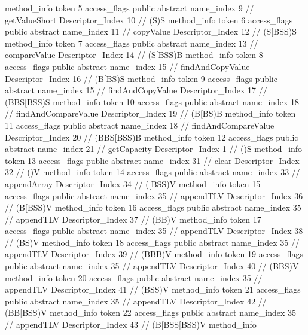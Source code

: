 {{{{{				}
				method_info {
					token	5
					access_flags	public abstract
					name_index	9		// getValueShort
					Descriptor_Index	10		// (S)S
				}
				method_info {
					token	6
					access_flags	public abstract
					name_index	11		// copyValue
					Descriptor_Index	12		// (S[BSS)S
				}
				method_info {
					token	7
					access_flags	public abstract
					name_index	13		// compareValue
					Descriptor_Index	14		// (S[BSS)B
				}
				method_info {
					token	8
					access_flags	public abstract
					name_index	15		// findAndCopyValue
					Descriptor_Index	16		// (B[BS)S
				}
				method_info {
					token	9
					access_flags	public abstract
					name_index	15		// findAndCopyValue
					Descriptor_Index	17		// (BBS[BSS)S
				}
				method_info {
					token	10
					access_flags	public abstract
					name_index	18		// findAndCompareValue
					Descriptor_Index	19		// (B[BS)B
				}
				method_info {
					token	11
					access_flags	public abstract
					name_index	18		// findAndCompareValue
					Descriptor_Index	20		// (BBS[BSS)B
				}
				method_info {
					token	12
					access_flags	public abstract
					name_index	21		// getCapacity
					Descriptor_Index	1		// ()S
				}
				method_info {
					token	13
					access_flags	public abstract
					name_index	31		// clear
					Descriptor_Index	32		// ()V
				}
				method_info {
					token	14
					access_flags	public abstract
					name_index	33		// appendArray
					Descriptor_Index	34		// ([BSS)V
				}
				method_info {
					token	15
					access_flags	public abstract
					name_index	35		// appendTLV
					Descriptor_Index	36		// (B[BSS)V
				}
				method_info {
					token	16
					access_flags	public abstract
					name_index	35		// appendTLV
					Descriptor_Index	37		// (BB)V
				}
				method_info {
					token	17
					access_flags	public abstract
					name_index	35		// appendTLV
					Descriptor_Index	38		// (BS)V
				}
				method_info {
					token	18
					access_flags	public abstract
					name_index	35		// appendTLV
					Descriptor_Index	39		// (BBB)V
				}
				method_info {
					token	19
					access_flags	public abstract
					name_index	35		// appendTLV
					Descriptor_Index	40		// (BBS)V
				}
				method_info {
					token	20
					access_flags	public abstract
					name_index	35		// appendTLV
					Descriptor_Index	41		// (BSS)V
				}
				method_info {
					token	21
					access_flags	public abstract
					name_index	35		// appendTLV
					Descriptor_Index	42		// (BB[BSS)V
				}
				method_info {
					token	22
					access_flags	public abstract
					name_index	35		// appendTLV
					Descriptor_Index	43		// (B[BSS[BSS)V
				}
				method_info {
}}}}}
